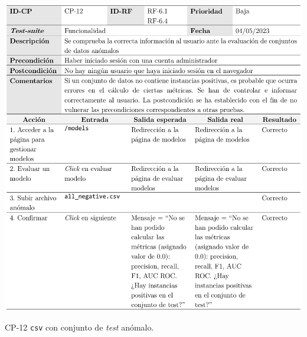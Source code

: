 \begin{table}[p]
	\centering
	\includegraphics[width=\textwidth]{../img/anexos/cp/CP-12}
	\caption{CP-12 \texttt{csv} con conjunto de \textit{test} anómalo.}
	\label{cp:strange-csv}
\end{table}